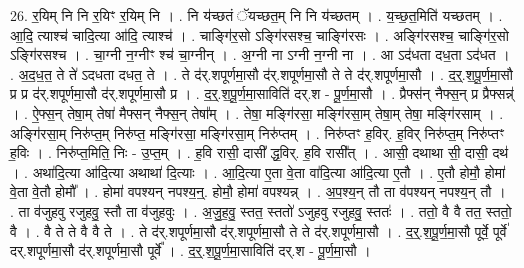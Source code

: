 \documentclass[17pt]{extarticle}
\begin{document}
26. र॒यिम् नि नि र॒यिꣳ र॒यिम् नि । . नि य॑च्छतं ॅयच्छत॒म् नि नि य॑च्छतम् । . य॒च्छ॒त॒मिति॑ यच्छतम् । . आ॒दि॒ त्याश्च॑ चादि॒त्या आ॑दि॒ त्याश्च॑ । . चाङ्गि॑र॒सो ऽङ्गि॑रसश्च॒ चाङ्गि॑रसः । . अङ्गि॑रसश्च॒ चाङ्गि॑र॒सो ऽङ्गि॑रसश्च । . चा॒ग्नी न॒ग्नीꣳ श्च॑ चा॒ग्नीन् । . अ॒ग्नी ना ऽग्नी न॒ग्नी ना । . आ ऽद॑धता दध॒ता ऽद॑धत । . अ॒द॒ध॒त॒ ते ते॑ ऽदधता दधत॒ ते । . ते द॑र्.शपूर्णमा॒सौ द॑र्.शपूर्णमा॒सौ ते ते द॑र्.शपूर्णमा॒सौ । . द॒र्॒.श॒पू॒र्ण॒मा॒सौ प्र प्र द॑र्.शपूर्णमा॒सौ द॑र्.शपूर्णमा॒सौ प्र । . द॒र्॒.श॒पू॒र्ण॒मा॒साविति॑ दर्.श - पू॒र्ण॒मा॒सौ । . प्रैफ्स॑न् नैफ्स॒न् प्र प्रैफ्सन्न्॑ । . ऐ॒फ्स॒न् तेषा॒म् तेषा॑ मैफ्सन् नैफ्स॒न् तेषा᳚म् । . तेषा॒ मङ्गि॑रसा॒ मङ्गि॑रसा॒म् तेषा॒म् तेषा॒ मङ्गि॑रसाम् । . अङ्गि॑रसा॒म् निरु॑प्त॒म् निरु॑प्त॒ मङ्गि॑रसा॒ मङ्गि॑रसा॒म् निरु॑प्तम् । . निरु॑प्तꣳ ह॒विर्. ह॒विर् निरु॑प्त॒म् निरु॑प्तꣳ ह॒विः । . निरु॑प्त॒मिति॒ निः - उ॒प्त॒म् । . ह॒वि रासी॒ दासी᳚ द्ध॒विर्. ह॒वि रासी᳚त् । . आसी॒ दथाथा सी॒ दासी॒ दथ॑ । . अथा॑दि॒त्या आ॑दि॒त्या अथाथा॑ दि॒त्याः । . आ॒दि॒त्या ए॒ता वे॒ता वा॑दि॒त्या आ॑दि॒त्या ए॒तौ । . ए॒तौ होमौ॒ होमा॑ वे॒ता वे॒तौ होमौ᳚ । . होमा॑ वपश्यन् नपश्य॒न्॒. होमौ॒ होमा॑ वपश्यन्न् । . अ॒प॒श्य॒न् तौ ता व॑पश्यन् नपश्य॒न् तौ । . ता व॑जुहवु रजुहवु॒ स्तौ ता व॑जुहवुः । . अ॒जु॒ह॒वु॒ स्तत॒ स्ततो॑ ऽजुहवु रजुहवु॒ स्ततः॑ । . ततो॒ वै वै तत॒ स्ततो॒ वै । . वै ते ते वै वै ते । . ते द॑र्.शपूर्णमा॒सौ द॑र्.शपूर्णमा॒सौ ते ते द॑र्.शपूर्णमा॒सौ । . द॒र्॒.श॒पू॒र्ण॒मा॒सौ पूर्वे॒ पूर्वे॑ दर्.शपूर्णमा॒सौ द॑र्.शपूर्णमा॒सौ पूर्वे᳚ । . द॒र्॒.श॒पू॒र्ण॒मा॒साविति॑ दर्.श - पू॒र्ण॒मा॒सौ । \newline
\end{document}
